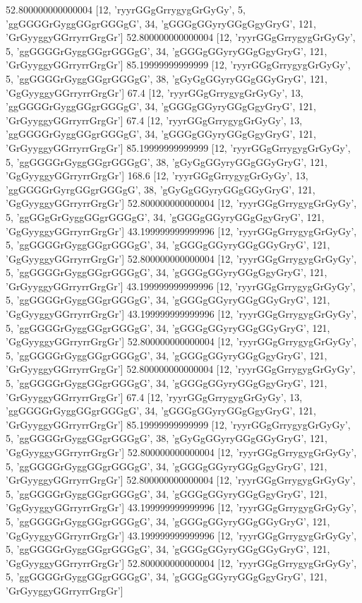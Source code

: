 52.800000000000004 [12, 'ryyrGGgGrrygygGrGyGy', 5, 'ggGGGGrGyggGGgrGGGgG', 34, 'gGGGgGGyryGGgGgyGryG', 121, 'GrGyyggyGGrryrrGrgGr']
52.800000000000004 [12, 'ryyrGGgGrrygygGrGyGy', 5, 'ggGGGGrGyggGGgrGGGgG', 34, 'gGGGgGGyryGGgGgyGryG', 121, 'GrGyyggyGGrryrrGrgGr']
85.19999999999999 [12, 'ryyrGGgGrrygygGrGyGy', 5, 'ggGGGGrGyggGGgrGGGgG', 38, 'gGyGgGGyryGGgGGyGryG', 121, 'GgGyyggyGGrryrrGrgGr']
67.4 [12, 'ryyrGGgGrrygygGrGyGy', 13, 'ggGGGGrGyggGGgrGGGgG', 34, 'gGGGgGGyryGGgGgyGryG', 121, 'GrGyyggyGGrryrrGrgGr']
67.4 [12, 'ryyrGGgGrrygygGrGyGy', 13, 'ggGGGGrGyggGGgrGGGgG', 34, 'gGGGgGGyryGGgGgyGryG', 121, 'GrGyyggyGGrryrrGrgGr']
85.19999999999999 [12, 'ryyrGGgGrrygygGrGyGy', 5, 'ggGGGGrGyggGGgrGGGgG', 38, 'gGyGgGGyryGGgGGyGryG', 121, 'GgGyyggyGGrryrrGrgGr']
168.6 [12, 'ryyrGGgGrrygygGrGyGy', 13, 'ggGGGGrGyrgGGgrGGGgG', 38, 'gGyGgGGyryGGgGGyGryG', 121, 'GgGyyggyGGrryrrGrgGr']
52.800000000000004 [12, 'ryyrGGgGrrygygGrGyGy', 5, 'ggGGgGrGyggGGgrGGGgG', 34, 'gGGGgGGyryGGgGgyGryG', 121, 'GgGyyggyGGrryrrGrgGr']
43.199999999999996 [12, 'ryyrGGgGrrygygGrGyGy', 5, 'ggGGGGrGyggGGgrGGGgG', 34, 'gGGGgGGyryGGgGGyGryG', 121, 'GgGyyggyGGrryrrGrgGr']
52.800000000000004 [12, 'ryyrGGgGrrygygGrGyGy', 5, 'ggGGGGrGyggGGgrGGGgG', 34, 'gGGGgGGyryGGgGgyGryG', 121, 'GrGyyggyGGrryrrGrgGr']
43.199999999999996 [12, 'ryyrGGgGrrygygGrGyGy', 5, 'ggGGGGrGyggGGgrGGGgG', 34, 'gGGGgGGyryGGgGGyGryG', 121, 'GgGyyggyGGrryrrGrgGr']
43.199999999999996 [12, 'ryyrGGgGrrygygGrGyGy', 5, 'ggGGGGrGyggGGgrGGGgG', 34, 'gGGGgGGyryGGgGGyGryG', 121, 'GgGyyggyGGrryrrGrgGr']
52.800000000000004 [12, 'ryyrGGgGrrygygGrGyGy', 5, 'ggGGGGrGyggGGgrGGGgG', 34, 'gGGGgGGyryGGgGgyGryG', 121, 'GrGyyggyGGrryrrGrgGr']
52.800000000000004 [12, 'ryyrGGgGrrygygGrGyGy', 5, 'ggGGGGrGyggGGgrGGGgG', 34, 'gGGGgGGyryGGgGgyGryG', 121, 'GrGyyggyGGrryrrGrgGr']
67.4 [12, 'ryyrGGgGrrygygGrGyGy', 13, 'ggGGGGrGyggGGgrGGGgG', 34, 'gGGGgGGyryGGgGgyGryG', 121, 'GrGyyggyGGrryrrGrgGr']
85.19999999999999 [12, 'ryyrGGgGrrygygGrGyGy', 5, 'ggGGGGrGyggGGgrGGGgG', 38, 'gGyGgGGyryGGgGGyGryG', 121, 'GgGyyggyGGrryrrGrgGr']
52.800000000000004 [12, 'ryyrGGgGrrygygGrGyGy', 5, 'ggGGGGrGyggGGgrGGGgG', 34, 'gGGGgGGyryGGgGgyGryG', 121, 'GrGyyggyGGrryrrGrgGr']
52.800000000000004 [12, 'ryyrGGgGrrygygGrGyGy', 5, 'ggGGGGrGyggGGgrGGGgG', 34, 'gGGGgGGyryGGgGgyGryG', 121, 'GgGyyggyGGrryrrGrgGr']
43.199999999999996 [12, 'ryyrGGgGrrygygGrGyGy', 5, 'ggGGGGrGyggGGgrGGGgG', 34, 'gGGGgGGyryGGgGGyGryG', 121, 'GgGyyggyGGrryrrGrgGr']
43.199999999999996 [12, 'ryyrGGgGrrygygGrGyGy', 5, 'ggGGGGrGyggGGgrGGGgG', 34, 'gGGGgGGyryGGgGGyGryG', 121, 'GgGyyggyGGrryrrGrgGr']
52.800000000000004 [12, 'ryyrGGgGrrygygGrGyGy', 5, 'ggGGGGrGyggGGgrGGGgG', 34, 'gGGGgGGyryGGgGgyGryG', 121, 'GrGyyggyGGrryrrGrgGr']
